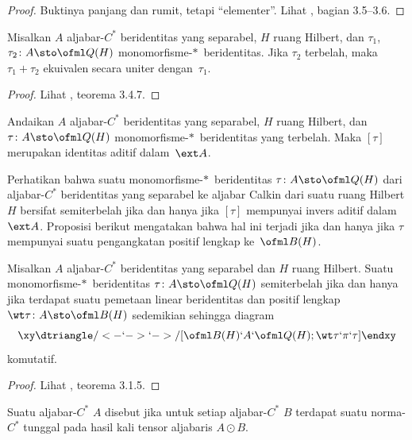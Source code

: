 \begin{proof} Buktinya panjang dan rumit, tetapi ``elementer''. Lihat \cite{HigsonR:2000},
bagian 3.5--3.6. \ns
\end{proof}

\begin{prop}\label{0058338} Misalkan $A$ aljabar-$C^*$ beridentitas yang separabel, $H$ ruang Hilbert,
dan $\tau_1$, $\tau_2 \colon A \sto \ofml Q(H)$ monomorfisme-$*\,$ beridentitas. Jika
$\tau_2$ terbelah, maka $\tau_1 + \tau_2$ ekuivalen secara uniter dengan~$\tau_1$.
\end{prop}

\begin{proof} Lihat \cite{HigsonR:2000}, teorema 3.4.7. \ns \end{proof}

\begin{cor}\label{0058339} Andaikan $A$ aljabar-$C^*$ beridentitas yang separabel, $H$ ruang
Hilbert, dan $\tau \colon A \sto \ofml Q(H)$ monomorfisme-$*\,$ beridentitas yang terbelah.
Maka $[\tau]$ merupakan identitas aditif dalam~$\ext A$.
\end{cor}

Perhatikan bahwa suatu monomorfisme-$*\,$ beridentitas $\tau\colon A \sto \ofml Q(H)$ dari aljabar-$C^*$
beridentitas yang separabel ke aljabar Calkin dari suatu ruang Hilbert $H$ bersifat semiterbelah jika dan
hanya jika $[\tau]$ mempunyai invers aditif dalam $\ext A$. Proposisi berikut mengatakan bahwa
hal ini terjadi jika dan hanya jika $\tau$ mempunyai suatu pengangkatan positif lengkap ke~$\ofml B(H)$.

\begin{prop}\label{0058411} Misalkan $A$ aljabar-$C^*$ beridentitas yang separabel dan $H$ ruang Hilbert.
Suatu monomorfisme-$*\,$ beridentitas $\tau\colon A \sto \ofml Q(H)$ semiterbelah jika dan hanya jika
terdapat suatu pemetaan linear beridentitas dan positif lengkap $\wt\tau\colon A \sto \ofml B(H)$ sedemikian sehingga
diagram
  \[
    \xy
      \dtriangle/<-`->`->/[\ofml B(H)`A`\ofml Q(H);\wt\tau`\pi`\tau]
    \endxy
   \]
komutatif.
\end{prop}

\begin{proof} Lihat \cite{HigsonR:2000}, teorema 3.1.5.  \ns \end{proof}

\begin{defn} Suatu aljabar-$C^*$ $A$ disebut
 jika untuk setiap aljabar-$C^*$ $B$ terdapat suatu norma-$C^*$ tunggal pada hasil kali
tensor aljabaris $A \odot B$.
\end{defn}

